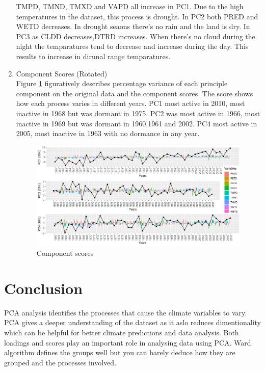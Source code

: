 \documentclass[12pt,a4paper]{article}
\begin{document}
\begin{enumerate}[label=\roman*)]
TMPD, TMND, TMXD and VAPD all increase in PC1. Due to the high temperatures in the dataset, this process is drought.  In PC2 both PRED and WETD decreases. In drought seaons there's no rain and the land is dry. In PC3 as CLDD decreases,DTRD increases. When there's no cloud during the night the temparatures tend to decrease and increase during the day. This results to increase in dirunal range temparatures.
\newpage
\item Component Scores (Rotated)\\
Figure \ref*{fig:scores} figuratively describes percentage variance of each principle component on the original data and the component scores. The score shows how each process varies in different years. PC1 most active in 2010, most inactive in 1968 but was dormant in 1975. PC2 was most active in 1966, most inactive in 1969 but was dormant in 1960,1961 and 2002. PC4 most active in 2005, most inactive in 1963 with no dormance in any year.

\newpage

\begin{figure}[h]
	\includegraphics[width=1.1\linewidth, height=0.5\textheight]{scores}
	\caption{Component scores}
	\label{fig:scores}
\end{figure}

\end{enumerate}


\section{Conclusion}

PCA analysis identifies the processes that cause the climate variables to vary. PCA gives a deeper understanding of the dataset as it aslo reduces dimentionality which can be helpful for better climate predictions and data analysis. 
Both loadings and scores play an important role in analysing data using PCA. Ward algorithm defines the groups well but you can barely deduce how they are grouped and the processes involved.
\end{document}

